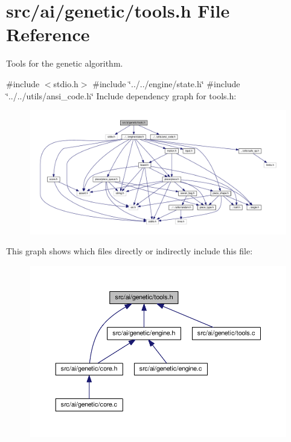 \section{src/ai/genetic/tools.h File Reference}
\label{tools_8h}


Tools for the genetic algorithm.  


{\ttfamily \#include $<$stdio.\+h$>$}\newline
{\ttfamily \#include \char`\"{}../../engine/state.\+h\char`\"{}}\newline
{\ttfamily \#include \char`\"{}../../utils/ansi\+\_\+code.\+h\char`\"{}}\newline
Include dependency graph for tools.\+h\+:
\nopagebreak
\begin{figure}[H]
\begin{center}
\leavevmode
\includegraphics[width=350pt]{tools_8h__incl}
\end{center}
\end{figure}
This graph shows which files directly or indirectly include this file\+:
\nopagebreak
\begin{figure}[H]
\begin{center}
\leavevmode
\includegraphics[width=350pt]{tools_8h__dep__incl}
\end{center}
\end{figure}
